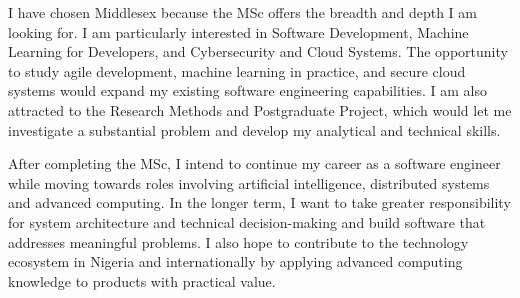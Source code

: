\documentclass[11pt,a4paper]{article}
\begin{document}
I have chosen Middlesex because the MSc offers the breadth and depth I am looking for. I am particularly interested in Software Development, Machine Learning for Developers, and Cybersecurity and Cloud Systems. The opportunity to study agile development, machine learning in practice, and secure cloud systems would expand my existing software engineering capabilities. I am also attracted to the Research Methods and Postgraduate Project, which would let me investigate a substantial problem and develop my analytical and technical skills.

After completing the MSc, I intend to continue my career as a software engineer while moving towards roles involving artificial intelligence, distributed systems and advanced computing. In the longer term, I want to take greater responsibility for system architecture and technical decision-making and build software that addresses meaningful problems. I also hope to contribute to the technology ecosystem in Nigeria and internationally by applying advanced computing knowledge to products with practical value.
\end{document}
